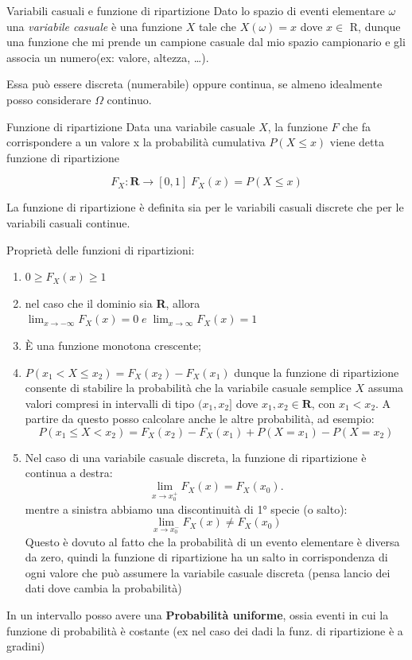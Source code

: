 \documentclass[openany,a4paper,12pt]{book}
\theoremstyle{remark}
\begin{document}
\begin{bressan}{Variabili casuali e funzione di ripartizione}
Dato lo spazio di eventi elementare $\omega$ una \textit{variabile casuale} è una funzione $X$ tale che $X(\omega)=x$ dove $x\in$ R,
dunque una funzione che mi prende un campione casuale dal mio spazio campionario e gli associa un numero(ex: valore, altezza, \ldots).

Essa può essere discreta (numerabile) oppure continua, se almeno idealmente posso considerare $\Omega$ continuo.
\end{bressan}
\begin{bressan}{Funzione di ripartizione}
Data una variabile casuale $X$, la funzione $F$ che fa corrispondere a un valore x la probabilità cumulativa $P(X \leq x)$ viene detta funzione di ripartizione

\[
F_X:\mathbf{R} \rightarrow [0,1] \; F_X(x)=P(X \leq x)
\]

La funzione di ripartizione è definita sia per le variabili casuali discrete che per le variabili casuali
continue.

Proprietà delle funzioni di ripartizioni:
\begin{enumerate}
    \item $0 \geq F_X(x) \geq 1$
    \item nel caso che il dominio sia \textbf{R}, allora $\displaystyle \lim_{x \rightarrow -\infty} F_X(x)=0 \; e \; \lim_{x \rightarrow \infty}F_X(x)=1$
    \item È una funzione monotona crescente;
    \item \( P(x_1 < X \leq x_2) = F_X(x_2) - F_X(x_1) \) dunque la funzione di ripartizione consente di stabilire la probabilità che la variabile casuale semplice \( X \) 
    assuma valori compresi in intervalli di tipo \((x_1, x_2]\) dove \( x_1, x_2 \in \mathbf{R} \), con \( x_1 < x_2 \). A partire da questo posso calcolare anche le altre probabilità, ad esempio:  
    \[ P(x_1 \leq X < x_2) = F_X(x_2) - F_X(x_1) + P(X = x_1) - P(X = x_2)\]
 
    \item Nel caso di una variabile casuale discreta, la funzione di ripartizione è continua a destra:  
    \[ \lim_{x \to x_0^+} F_X(x) = F_X(x_0).\]  
    mentre a sinistra abbiamo una discontinuità di 1° specie (o salto):  
    \[ \lim_{x \to x_0^-} F_X(x) \neq F_X(x_0)\]  
    Questo è dovuto al fatto che la probabilità di un evento elementare è diversa da zero, quindi la funzione di ripartizione ha un salto in corrispondenza di ogni valore che può assumere la variabile casuale discreta (pensa lancio dei dati dove cambia la probabilità)
\end{enumerate}

In un intervallo posso avere una \textbf{Probabilità uniforme}, ossia eventi in cui la funzione di probabilità è costante (ex nel caso dei dadi la funz. di ripartizione è a gradini)
\end{bressan}
\end{document}
